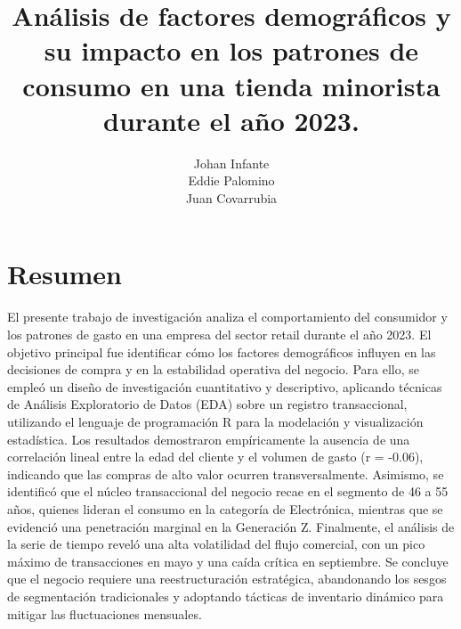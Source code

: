 \documentclass[oneside,11pt]{Latex/Classes/PhDthesisPSnPDF}
\title{Análisis de factores demográficos y su impacto en los patrones de
consumo en una tienda minorista durante el año 2023.}
\author{Johan Infante \\ Eddie Palomino \\ Juan Covarrubia}
\begin{document}
\maketitle

\frontmatter


\setcounter{secnumdepth}{3}
\setcounter{tocdepth}{3}

\tableofcontents



\cleardoublepage

  \cleardoublepage       %
  \chapter*{Resumen}     %
  
  El presente trabajo de investigación analiza el comportamiento del
consumidor y los patrones de gasto en una empresa del sector retail
durante el año 2023. El objetivo principal fue identificar cómo los
factores demográficos influyen en las decisiones de compra y en la
estabilidad operativa del negocio. Para ello, se empleó un diseño de
investigación cuantitativo y descriptivo, aplicando técnicas de Análisis
Exploratorio de Datos (EDA) sobre un registro transaccional, utilizando
el lenguaje de programación R para la modelación y visualización
estadística. Los resultados demostraron empíricamente la ausencia de una
correlación lineal entre la edad del cliente y el volumen de gasto (r =
-0.06), indicando que las compras de alto valor ocurren
transversalmente. Asimismo, se identificó que el núcleo transaccional
del negocio recae en el segmento de 46 a 55 años, quienes lideran el
consumo en la categoría de Electrónica, mientras que se evidenció una
penetración marginal en la Generación Z. Finalmente, el análisis de la
serie de tiempo reveló una alta volatilidad del flujo comercial, con un
pico máximo de transacciones en mayo y una caída crítica en septiembre.
Se concluye que el negocio requiere una reestructuración estratégica,
abandonando los sesgos de segmentación tradicionales y adoptando
tácticas de inventario dinámico para mitigar las fluctuaciones
mensuales.             %
  
\end{document}
